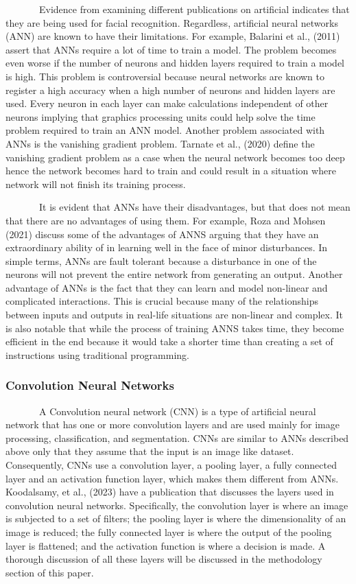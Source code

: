 \documentclass[
  12pt,
]{article}
\begin{document}
~~~~~~~Evidence from examining different publications on artificial
indicates that they are being used for facial recognition. Regardless,
artificial neural networks (ANN) are known to have their limitations.
For example, Balarini et al., (2011) assert that ANNs require a lot of
time to train a model. The problem becomes even worse if the number of
neurons and hidden layers required to train a model is high. This
problem is controversial because neural networks are known to register a
high accuracy when a high number of neurons and hidden layers are used.
Every neuron in each layer can make calculations independent of other
neurons implying that graphics processing units could help solve the
time problem required to train an ANN model. Another problem associated
with ANNs is the vanishing gradient problem. Tarnate et al., (2020)
define the vanishing gradient problem as a case when the neural network
becomes too deep hence the network becomes hard to train and could
result in a situation where network will not finish its training
process.

~~~~~~~It is evident that ANNs have their disadvantages, but that does
not mean that there are no advantages of using them. For example, Roza
and Mohsen (2021) discuss some of the advantages of ANNS arguing that
they have an extraordinary ability of in learning well in the face of
minor disturbances. In simple terms, ANNs are fault tolerant because a
disturbance in one of the neurons will not prevent the entire network
from generating an output. Another advantage of ANNs is the fact that
they can learn and model non-linear and complicated interactions. This
is crucial because many of the relationships between inputs and outputs
in real-life situations are non-linear and complex. It is also notable
that while the process of training ANNS takes time, they become
efficient in the end because it would take a shorter time than creating
a set of instructions using traditional programming.

\subsubsection{Convolution Neural
Networks}\label{convolution-neural-networks}

~~~~~~~A Convolution neural network (CNN) is a type of artificial neural
network that has one or more convolution layers and are used mainly for
image processing, classification, and segmentation. CNNs are similar to
ANNs described above only that they assume that the input is an image
like dataset. Consequently, CNNs use a convolution layer, a pooling
layer, a fully connected layer and an activation function layer, which
makes them different from ANNs. Koodalsamy, et al., (2023) have a
publication that discusses the layers used in convolution neural
networks. Specifically, the convolution layer is where an image is
subjected to a set of filters; the pooling layer is where the
dimensionality of an image is reduced; the fully connected layer is
where the output of the pooling layer is flattened; and the activation
function is where a decision is made. A thorough discussion of all these
layers will be discussed in the methodology section of this paper.
\end{document}
